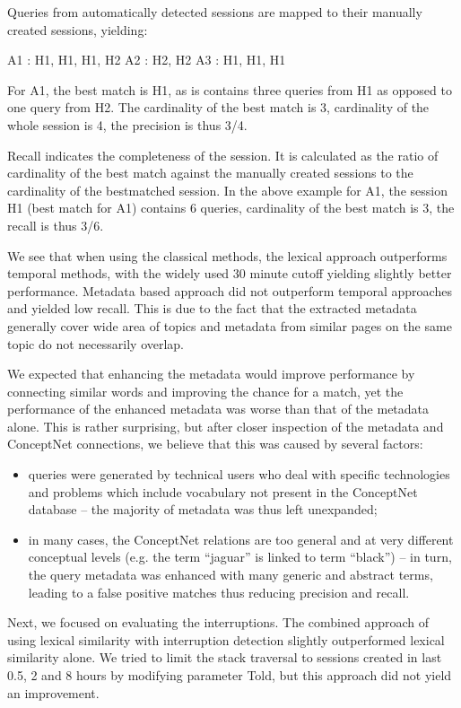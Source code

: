 \documentclass{acm_proc_article-sp} %
\begin{document}
Queries from automatically detected sessions are mapped to
their manually created sessions, yielding:

A1 : {H1, H1, H1, H2}
A2 : {H2, H2}
A3 : {H1, H1, H1}

For A1, the best match is H1, as is contains three queries
from H1 as opposed to one query from H2. The cardinality
of the best match is 3, cardinality of the whole session is 4,
the precision is thus 3/4.

Recall indicates the completeness of the session. It is calculated
as the ratio of cardinality of the best match against
the manually created sessions to the cardinality of the bestmatched
session. In the above example for A1, the session
H1 (best match for A1) contains 6 queries, cardinality of the
best match is 3, the recall is thus 3/6.

We see that when using the classical methods, the lexical
approach outperforms temporal methods, with the widely
used 30 minute cutoff yielding slightly better performance.
Metadata based approach did not outperform temporal approaches
and yielded low recall. This is due to the fact that
the extracted metadata generally cover wide area of topics
and metadata from similar pages on the same topic do not
necessarily overlap.

We expected that enhancing the metadata would improve
performance by connecting similar words and improving the
chance for a match, yet the performance of the enhanced
metadata was worse than that of the metadata alone. This
is rather surprising, but after closer inspection of the metadata
and ConceptNet connections, we believe that this was
caused by several factors:

\begin{itemize} 
	\item queries were generated by technical users who deal
	with specific technologies and problems which include
	vocabulary not present in the ConceptNet database –
	the majority of metadata was thus left unexpanded;
	\item in many cases, the ConceptNet relations are too general
	and at very different conceptual levels (e.g. the
	term “jaguar” is linked to term “black”) – in turn, the
	query metadata was enhanced with many generic and
	abstract terms, leading to a false positive matches thus
	reducing precision and recall.
\end{itemize}

Next, we focused on evaluating the interruptions. The combined
approach of using lexical similarity with interruption
detection slightly outperformed lexical similarity alone. We
tried to limit the stack traversal to sessions created in last
0.5, 2 and 8 hours by modifying parameter Told, but this
approach did not yield an improvement.
\end{document}
